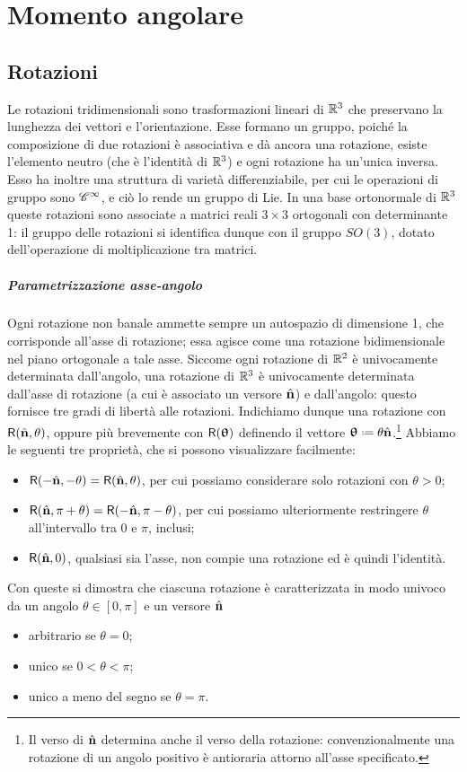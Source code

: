 \chapter{Momento angolare}
\section{Rotazioni}
Le rotazioni tridimensionali sono trasformazioni lineari di $\R^3$ che preservano la lunghezza dei vettori e l'orientazione.
Esse formano un gruppo, poich\'e la composizione di due rotazioni è associativa e dà ancora una rotazione, esiste l'elemento neutro (che è l'identità di $\R^3$) e ogni rotazione ha un'unica inversa.
Esso ha inoltre una struttura di varietà differenziabile, per cui le operazioni di gruppo sono $\cclass[\infty]$, e ciò lo rende un gruppo di Lie.
In una base ortonormale di $\R^3$ queste rotazioni sono associate a matrici reali $3\times 3$ ortogonali con determinante 1: il gruppo delle rotazioni si identifica dunque con il gruppo $SO(3)$, dotato dell'operazione di moltiplicazione tra matrici.

\paragraph{Parametrizzazione asse-angolo}
Ogni rotazione non banale ammette sempre un autospazio di dimensione 1, che corrisponde all'asse di rotazione; essa agisce come una rotazione bidimensionale nel piano ortogonale a tale asse.
Siccome ogni rotazione di $\R^2$ è univocamente determinata dall'angolo, una rotazione di $\R^3$ è univocamente determinata dall'asse di rotazione (a cui è associato un versore $\axis$) e dall'angolo: questo fornisce tre gradi di libertà alle rotazioni.
Indichiamo dunque una rotazione con $\Rot(\axis,\theta)$, oppure più brevemente con $\Rot(\vtheta)$ definendo il vettore $\vtheta\defeq\theta\axis$.\footnote{Il verso di $\axis$ determina anche il verso della rotazione: convenzionalmente una rotazione di un angolo positivo è antioraria attorno all'asse specificato.}
Abbiamo le seguenti tre proprietà, che si possono visualizzare facilmente:
\begin{itemize}
	\item $\Rot(-\axis,-\theta)=\Rot(\axis,\theta)$, per cui possiamo considerare solo rotazioni con $\theta>0$;
	\item $\Rot(\axis,\pi+\theta)=\Rot(-\axis,\pi-\theta)$, per cui possiamo ulteriormente restringere $\theta$ all'intervallo tra $0$ e $\pi$, inclusi;
	\item $\Rot(\axis,0)$, qualsiasi sia l'asse, non compie una rotazione ed è quindi l'identità.
\end{itemize}
Con queste si dimostra che ciascuna rotazione è caratterizzata in modo univoco da un angolo $\theta\in[0,\pi]$ e un versore $\axis$
\begin{itemize}
	\item arbitrario se $\theta=0$;
	\item unico se $0<\theta<\pi$;
	\item unico a meno del segno se $\theta=\pi$.
\end{itemize}

